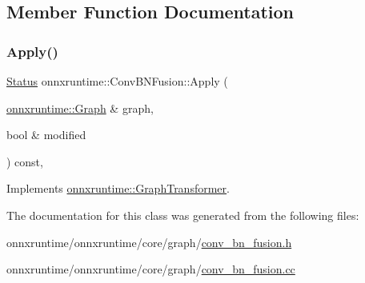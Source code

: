 \subsection{Member Function Documentation}
\mbox{\label{classonnxruntime_1_1ConvBNFusion_af12cb45d190871716c8e88f73b6b0bfa}} 
\subsubsection{\texorpdfstring{Apply()}{Apply()}}
{\footnotesize\ttfamily \mbox{\hyperlink{classonnxruntime_1_1common_1_1Status}{Status}} onnxruntime\+::\+Conv\+B\+N\+Fusion\+::\+Apply (\begin{DoxyParamCaption}\item[{\mbox{\hyperlink{classonnxruntime_1_1Graph}{onnxruntime\+::\+Graph}} \&}]{graph,  }\item[{bool \&}]{modified }\end{DoxyParamCaption}) const\hspace{0.3cm}{\ttfamily [override]}, {\ttfamily [virtual]}}



Implements \mbox{\hyperlink{classonnxruntime_1_1GraphTransformer_a690d351da797884409b1d7aa584e33b5}{onnxruntime\+::\+Graph\+Transformer}}.



The documentation for this class was generated from the following files\+:\begin{DoxyCompactItemize}
\item 
onnxruntime/onnxruntime/core/graph/\mbox{\hyperlink{conv__bn__fusion_8h}{conv\+\_\+bn\+\_\+fusion.\+h}}\item 
onnxruntime/onnxruntime/core/graph/\mbox{\hyperlink{conv__bn__fusion_8cc}{conv\+\_\+bn\+\_\+fusion.\+cc}}\end{DoxyCompactItemize}
